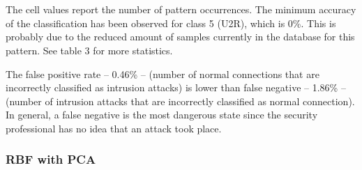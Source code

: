 \documentclass[twocolumn,11pt]{asme2ej}
\begin{document}
\smallskip\noindent
{}
\\\\

The cell values report the number of pattern occurrences. The minimum accuracy of the classification has been observed for class 5 (U2R), which is 0\%. This is probably due to the reduced amount of samples currently in the database for this pattern. See table 3 for more statistics.

The false positive rate -- 0.46\% -- (number of normal connections that are incorrectly classified as intrusion attacks) is lower than false negative -- 1.86\% -- (number of intrusion attacks that are incorrectly classified as normal connection). In general, a false negative is the most dangerous state since the security professional has no idea that an attack took place.


\subsubsection{RBF with PCA}
\end{document}
